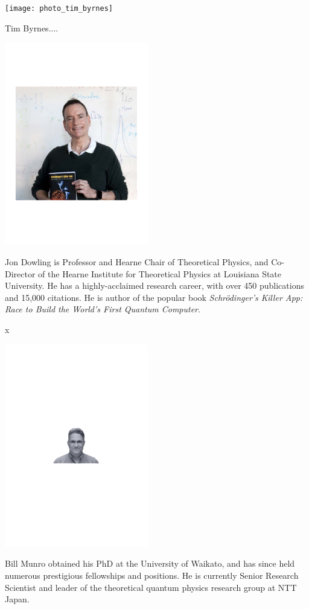 
\begin{center}
\texttt{[image: photo\_tim\_byrnes]}
\end{center}

Tim Byrnes....


\begin{center}
\includegraphics[width=0.47\textwidth]{photo_jon_dowling}
\end{center}

Jon Dowling is Professor and Hearne Chair of Theoretical Physics, and Co-Director of the Hearne Institute for Theoretical Physics at Louisiana State University. He has a highly-acclaimed research career, with over 450 publications and 15,000 citations. He is author of the popular book \textit{Schr\"odinger's Killer App: Race to Build the World's First Quantum Computer}.

x

\begin{center}
\includegraphics[width=0.47\textwidth]{photo_bill_munro}
\end{center}

Bill Munro obtained his PhD at the University of Waikato, and has since held numerous prestigious fellowships and positions. He is currently Senior Research Scientist and leader of the theoretical quantum physics research group at NTT Japan.

